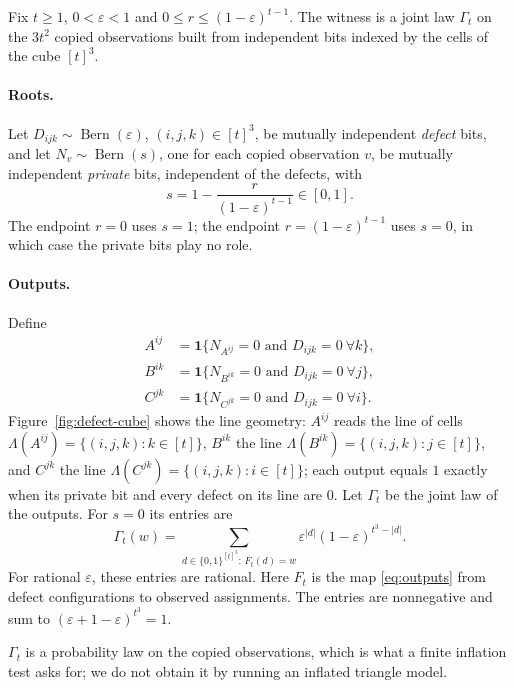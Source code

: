 \documentclass[11pt]{article}
\theoremstyle{plain}
\theoremstyle{definition}
\DeclareMathOperator{\Bern}{Bern}
\newcommand{\eps}{\varepsilon}
\newcommand{\one}{\mathbf 1}
\begin{document}
Fix $t\ge1$, $0<\eps<1$ and $0\le r\le(1-\eps)^{t-1}$. The witness is a joint law $\Gamma_t$ on the $3t^2$ copied observations built from independent bits indexed by the cells of the cube $[t]^3$.

\paragraph{Roots.}
Let $D_{ijk}\sim\Bern(\eps)$, $(i,j,k)\in[t]^3$, be mutually independent \emph{defect} bits, and let $N_v\sim\Bern(s)$, one for each copied observation $v$, be mutually independent \emph{private} bits, independent of the defects, with
\begin{equation}\label{eq:s}
s=1-\frac{r}{(1-\eps)^{t-1}}\in[0,1].
\end{equation}
The endpoint $r=0$ uses $s=1$; the endpoint $r=(1-\eps)^{t-1}$ uses $s=0$, in which case the private bits play no role.

\paragraph{Outputs.}
Define
\begin{equation}\label{eq:outputs}
\begin{aligned}
A^{ij}&=\one\bigl\{N_{A^{ij}}=0\text{ and }D_{ijk}=0\ \forall k\bigr\},\\
B^{ik}&=\one\bigl\{N_{B^{ik}}=0\text{ and }D_{ijk}=0\ \forall j\bigr\},\\
C^{jk}&=\one\bigl\{N_{C^{jk}}=0\text{ and }D_{ijk}=0\ \forall i\bigr\}.
\end{aligned}
\end{equation}
Figure~\ref{fig:defect-cube} shows the line geometry: $A^{ij}$ reads the line of cells $\Lambda(A^{ij})=\{(i,j,k):k\in[t]\}$, $B^{ik}$ the line $\Lambda(B^{ik})=\{(i,j,k):j\in[t]\}$, and $C^{jk}$ the line $\Lambda(C^{jk})=\{(i,j,k):i\in[t]\}$; each output equals $1$ exactly when its private bit and every defect on its line are $0$. Let $\Gamma_t$ be the joint law of the outputs. For $s=0$ its entries are
\begin{equation}\label{eq:table}
\Gamma_t(w)=\sum_{d\in\{0,1\}^{[t]^3}:\,F_t(d)=w}\eps^{|d|}(1-\eps)^{t^3-|d|}.
\end{equation}
For rational $\eps$, these entries are rational. Here $F_t$ is the map \eqref{eq:outputs} from defect configurations to observed assignments. The entries are nonnegative and sum to $(\eps+1-\eps)^{t^3}=1$.

$\Gamma_t$ is a probability law on the copied observations, which is what a finite inflation test asks for; we do not obtain it by running an inflated triangle model.
\end{document}
